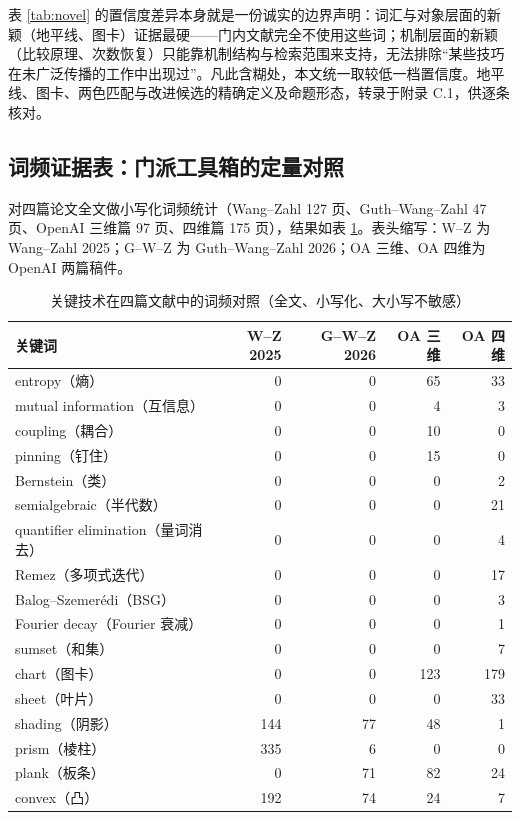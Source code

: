 表 \ref{tab:novel} 的置信度差异本身就是一份诚实的边界声明：词汇与对象层面的新颖（地平线、图卡）证据最硬——门内文献完全不使用这些词；机制层面的新颖（比较原理、次数恢复）只能靠机制结构与检索范围来支持，无法排除“某些技巧在未广泛传播的工作中出现过”。凡此含糊处，本文统一取较低一档置信度。地平线、图卡、两色匹配与改进候选的精确定义及命题形态，转录于附录 C.1，供逐条核对。

\subsection{词频证据表：门派工具箱的定量对照}

对四篇论文全文做小写化词频统计（Wang--Zahl 127 页、Guth--Wang--Zahl 47 页、OpenAI 三维篇 97 页、四维篇 175 页），结果如表 \ref{tab:wordfreq}。表头缩写：W--Z 为 Wang--Zahl 2025；G--W--Z 为 Guth--Wang--Zahl 2026；OA 三维、OA 四维为 OpenAI 两篇稿件。

\begin{table}[t]
\centering
\caption{关键技术在四篇文献中的词频对照（全文、小写化、大小写不敏感）}
\label{tab:wordfreq}
\footnotesize
\begin{tabularx}{\textwidth}{@{}Xrrrr@{}}
\toprule
\rowcolor{lightbg}\textbf{关键词} & \textbf{W--Z 2025} & \textbf{G--W--Z 2026} & \textbf{OA 三维} & \textbf{OA 四维} \\
\midrule
entropy（熵） & 0 & 0 & 65 & 33 \\
mutual information（互信息） & 0 & 0 & 4 & 3 \\
coupling（耦合） & 0 & 0 & 10 & 0 \\
pinning（钉住） & 0 & 0 & 15 & 0 \\
Bernstein（类） & 0 & 0 & 0 & 2 \\
semialgebraic（半代数） & 0 & 0 & 0 & 21 \\
quantifier elimination（量词消去） & 0 & 0 & 0 & 4 \\
Remez（多项式迭代） & 0 & 0 & 0 & 17 \\
Balog--Szemer\'edi（BSG） & 0 & 0 & 0 & 3 \\
Fourier decay（Fourier 衰减） & 0 & 0 & 0 & 1 \\
sumset（和集） & 0 & 0 & 0 & 7 \\
\midrule
chart（图卡） & 0 & 0 & 123 & 179 \\
sheet（叶片） & 0 & 0 & 0 & 33 \\
shading（阴影） & 144 & 77 & 48 & 1 \\
prism（棱柱） & 335 & 6 & 0 & 0 \\
plank（板条） & 0 & 71 & 82 & 24 \\
convex（凸） & 192 & 74 & 24 & 7 \\
\bottomrule
\end{tabularx}
\end{table}

